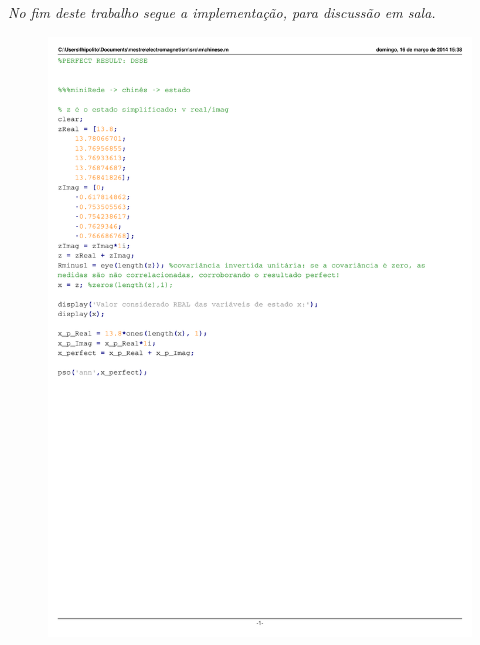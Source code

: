 \documentclass{IEEEtran}
\begin{document}
\textit{No fim deste trabalho segue a implementação, para discussão em sala.}
\begin{figure}
	\centering
	\includegraphics{chinese.pdf}
	\label{chinese}
\end{figure}
\end{document}
